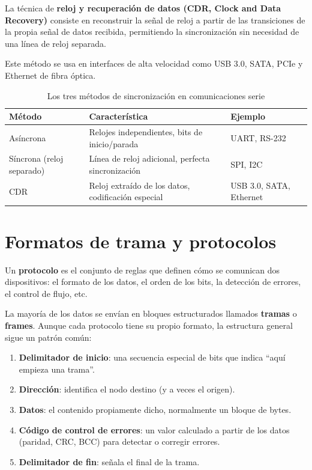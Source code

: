\begin{definicion}
La técnica de \textbf{reloj y recuperación de datos (CDR, Clock and Data Recovery)} consiste en reconstruir la señal de reloj a partir de las transiciones de la propia señal de datos recibida, permitiendo la sincronización sin necesidad de una línea de reloj separada.
\end{definicion}

Este método se usa en interfaces de alta velocidad como USB 3.0, SATA, PCIe y Ethernet de fibra óptica.

\begin{table}[htbp]
\centering
\small
\caption{Los tres métodos de sincronización en comunicaciones serie}
\begin{tabularx}{\textwidth}{@{}lXX@{}}
\toprule
\textbf{Método} & \textbf{Característica} & \textbf{Ejemplo} \\
\midrule
Asíncrona & Relojes independientes, bits de inicio/parada & UART, RS-232 \\
Síncrona (reloj separado) & Línea de reloj adicional, perfecta sincronización & SPI, I2C \\
CDR & Reloj extraído de los datos, codificación especial & USB 3.0, SATA, Ethernet \\
\bottomrule
\end{tabularx}
\end{table}


\section{Formatos de trama y protocolos}

Un \textbf{protocolo} es el conjunto de reglas que definen cómo se comunican dos dispositivos: el formato de los datos, el orden de los bits, la detección de errores, el control de flujo, etc.

La mayoría de los datos se envían en bloques estructurados llamados \textbf{tramas} o \textbf{frames}. Aunque cada protocolo tiene su propio formato, la estructura general sigue un patrón común:

\begin{enumerate}
    \item \textbf{Delimitador de inicio}: una secuencia especial de bits que indica ``aquí empieza una trama''.
    \item \textbf{Dirección}: identifica el nodo destino (y a veces el origen).
    \item \textbf{Datos}: el contenido propiamente dicho, normalmente un bloque de bytes.
    \item \textbf{Código de control de errores}: un valor calculado a partir de los datos (paridad, CRC, BCC) para detectar o corregir errores.
    \item \textbf{Delimitador de fin}: señala el final de la trama.
\end{enumerate}


